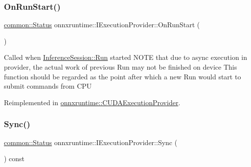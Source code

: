 \mbox{\label{classonnxruntime_1_1IExecutionProvider_a0d724b727c4518125b5b154b481bccb3}} 
\subsubsection{\texorpdfstring{On\+Run\+Start()}{OnRunStart()}}
{\footnotesize\ttfamily \mbox{\hyperlink{classonnxruntime_1_1common_1_1Status}{common\+::\+Status}} onnxruntime\+::\+I\+Execution\+Provider\+::\+On\+Run\+Start (\begin{DoxyParamCaption}{ }\end{DoxyParamCaption})\hspace{0.3cm}{\ttfamily [virtual]}}

Called when \mbox{\hyperlink{classonnxruntime_1_1InferenceSession_a90aa8b5fdc2638c4d2c45afc9c3ed222}{Inference\+Session\+::\+Run}} started N\+O\+TE that due to async execution in provider, the actual work of previous Run may not be finished on device This function should be regarded as the point after which a new Run would start to submit commands from C\+PU 

Reimplemented in \mbox{\hyperlink{classonnxruntime_1_1CUDAExecutionProvider_abf7e482aba687b89fcbd6586271ca753}{onnxruntime\+::\+C\+U\+D\+A\+Execution\+Provider}}.

\mbox{\label{classonnxruntime_1_1IExecutionProvider_a3657d5ed274547507a7b99d466fa13ef}} 
\subsubsection{\texorpdfstring{Sync()}{Sync()}}
{\footnotesize\ttfamily \mbox{\hyperlink{classonnxruntime_1_1common_1_1Status}{common\+::\+Status}} onnxruntime\+::\+I\+Execution\+Provider\+::\+Sync (\begin{DoxyParamCaption}{ }\end{DoxyParamCaption}) const\hspace{0.3cm}{\ttfamily [virtual]}}

